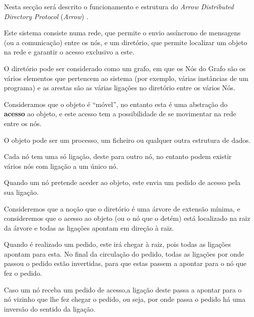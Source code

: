 Nesta secção será descrito o funcionamento e estrutura do \textit{Arrow Distributed Directory Protocol} (\emph{Arrow}) \cite{Arrow}. 

Este sistema consiste numa rede, que permite o envio assíncrono de mensagens (ou a comunicação) entre os nós, e um diretório, que permite localizar um objeto na rede e garantir o acesso exclusivo a este. 

O diretório pode ser considerado como um grafo, em que os Nós do Grafo são os vários elementos que pertencem ao sistema (por exemplo, várias instâncias de um programa) e as arestas são as várias ligações no diretório entre os vários Nós.

Consideramos que o objeto é ``móvel'', no entanto esta é uma abstração do \textbf{acesso} ao objeto, e este acesso tem a possibilidade de se movimentar na rede entre os nós.

O objeto pode ser um processo, um ficheiro ou qualquer outra estrutura de dados.

Cada nó tem uma só ligação, deste para outro nó, no entanto podem existir vários nós com ligação a um único nó.


Quando um nó pretende aceder ao objeto, este envia um pedido de acesso pela sua ligação. 



Consideremos que a noção que o diretório é uma árvore de extensão mínima, e consideremos que o acesso ao objeto (ou o nó que o detém) está localizado na raiz da árvore e todas as ligações apontam em direção à raiz.

Quando é realizado um pedido, este irá chegar à raiz, pois todas as ligações apontam para esta. No final da circulação do pedido, todas as ligações por onde passou o pedido estão invertidas, para que estas passem a apontar para o nó que fez o pedido.

Caso um nó receba um pedido de acesso,a ligação deste passa a apontar para o nó vizinho que lhe fez chegar o pedido, ou seja, por onde passa o pedido há uma inversão do sentido da ligação.



